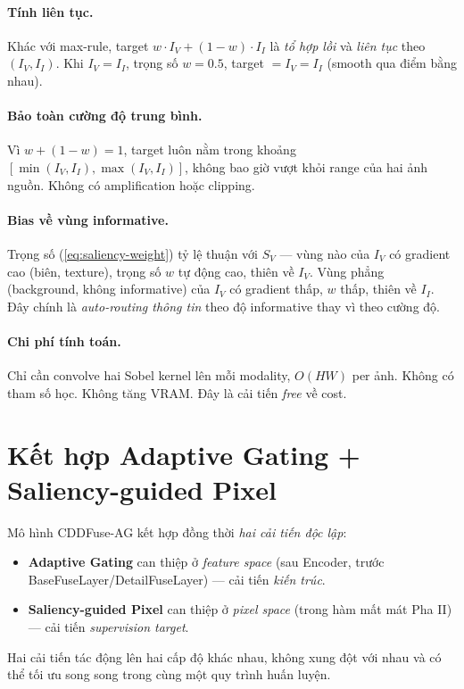 \paragraph{Tính liên tục.}
Khác với max-rule, target $w \cdot I_V + (1-w) \cdot I_I$ là \emph{tổ hợp lồi} và \emph{liên tục} theo $(I_V, I_I)$. Khi $I_V = I_I$, trọng số $w = 0.5$, target $= I_V = I_I$ (smooth qua điểm bằng nhau).

\paragraph{Bảo toàn cường độ trung bình.}
Vì $w + (1-w) = 1$, target luôn nằm trong khoảng $[\min(I_V, I_I), \max(I_V, I_I)]$, không bao giờ vượt khỏi range của hai ảnh nguồn. Không có amplification hoặc clipping.

\paragraph{Bias về vùng informative.}
Trọng số (\ref{eq:saliency-weight}) tỷ lệ thuận với $S_V$ --- vùng nào của $I_V$ có gradient cao (biên, texture), trọng số $w$ tự động cao, thiên về $I_V$. Vùng phẳng (background, không informative) của $I_V$ có gradient thấp, $w$ thấp, thiên về $I_I$. Đây chính là \emph{auto-routing thông tin} theo độ informative thay vì theo cường độ.

\paragraph{Chi phí tính toán.}
Chỉ cần convolve hai Sobel kernel lên mỗi modality, $O(HW)$ per ảnh. Không có tham số học. Không tăng VRAM. Đây là cải tiến \emph{free} về cost.

\section{Kết hợp Adaptive Gating + Saliency-guided Pixel}
\label{sec:cddfuse-ag-combined}

Mô hình CDDFuse-AG kết hợp đồng thời \emph{hai cải tiến độc lập}:
\begin{itemize}\itemsep2pt
    \item \textbf{Adaptive Gating} can thiệp ở \emph{feature space} (sau Encoder, trước BaseFuseLayer/DetailFuseLayer) --- cải tiến \emph{kiến trúc}.
    \item \textbf{Saliency-guided Pixel} can thiệp ở \emph{pixel space} (trong hàm mất mát Pha II) --- cải tiến \emph{supervision target}.
\end{itemize}
Hai cải tiến tác động lên hai cấp độ khác nhau, không xung đột với nhau và có thể tối ưu song song trong cùng một quy trình huấn luyện.

